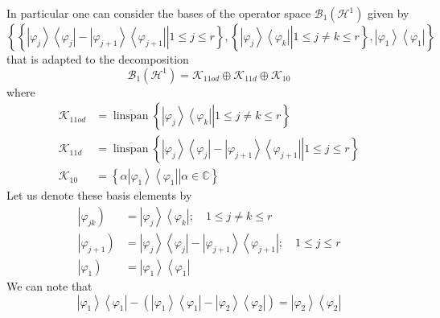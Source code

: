 \documentclass[aps,preprint]{revtex4}%
\begin{document}
In particular one can consider the bases of the operator space $\mathcal{B}%
_{1}\left(  \mathcal{H}^{1}\right)  $ given by%
\begin{equation}
\left\{  \left\{  \left.  \left\vert \varphi_{j}\right\rangle \left\langle
\varphi_{j}\right\vert -\left\vert \varphi_{j+1}\right\rangle \left\langle
\varphi_{j+1}\right\vert \right\vert 1\leq j\leq r\right\}  ,\left\{  \left.
\left\vert \varphi_{j}\right\rangle \left\langle \varphi_{k}\right\vert
\right\vert 1\leq j\neq k\leq r\right\}  ,\left\vert \varphi_{1}\right\rangle
\left\langle \varphi_{1}\right\vert \right\}
\end{equation}
that is adapted to the decomposition
\begin{equation}
\mathcal{B}_{1}\left(  \mathcal{H}^{1}\right)  =\mathcal{K}_{11od}%
\oplus\mathcal{K}_{11d}\oplus\mathcal{K}_{10}\label{graddec}%
\end{equation}
where
\begin{align}
\mathcal{K}_{11od} &  =\overline{\operatorname{linspan}}\left\{  \left.
\left\vert \varphi_{j}\right\rangle \left\langle \varphi_{k}\right\vert
\right\vert 1\leq j\neq k\leq r\right\}  \nonumber\\
\mathcal{K}_{11d} &  =\overline{\operatorname{linspan}}\left\{  \left.
\left\vert \varphi_{j}\right\rangle \left\langle \varphi_{j}\right\vert
-\left\vert \varphi_{j+1}\right\rangle \left\langle \varphi_{j+1}\right\vert
\right\vert 1\leq j\leq r\right\}  \nonumber\\
\mathcal{K}_{10} &  =\left\{  \left.  \alpha\left\vert \varphi_{1}%
\right\rangle \left\langle \varphi_{1}\right\vert \right\vert \alpha
\in\mathbb{C}\right\}
\end{align}
Let us denote these basis elements by
\begin{align}
\left\vert \varphi_{jk}\right)   &  =\left\vert \varphi_{j}\right\rangle
\left\langle \varphi_{k}\right\vert ;\quad1\leq j\neq k\leq r\nonumber\\
\left\vert \varphi_{j+1}\right)   &  =\left\vert \varphi_{j}\right\rangle
\left\langle \varphi_{j}\right\vert -\left\vert \varphi_{j+1}\right\rangle
\left\langle \varphi_{j+1}\right\vert ;\quad1\leq j\leq r\nonumber\\
\left\vert \varphi_{1}\right)   &  =\left\vert \varphi_{1}\right\rangle
\left\langle \varphi_{1}\right\vert
\end{align}
We can note that
\begin{equation}
\left\vert \varphi_{1}\right\rangle \left\langle \varphi_{1}\right\vert
-\left(  \left\vert \varphi_{1}\right\rangle \left\langle \varphi
_{1}\right\vert -\left\vert \varphi_{2}\right\rangle \left\langle \varphi
_{2}\right\vert \right)  =\left\vert \varphi_{2}\right\rangle \left\langle
\varphi_{2}\right\vert
\end{equation}
\end{document}
